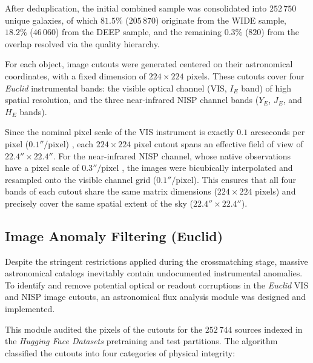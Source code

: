 After deduplication, the initial combined sample was consolidated into $252\,750$ unique galaxies, of which $81.5\%$ ($205\,870$) originate from the WIDE sample, $18.2\%$ ($46\,060$) from the DEEP sample, and the remaining $0.3\%$ ($820$) from the overlap resolved via the quality hierarchy.

For each object, image cutouts were generated centered on their astronomical coordinates, with a fixed dimension of $224 \times 224$ pixels. These cutouts cover four \textit{Euclid} instrumental bands: the visible optical channel (VIS, $I_E$ band) of high spatial resolution, and the three near-infrared NISP channel bands ($Y_E$, $J_E$, and $H_E$ bands).

Since the nominal pixel scale of the VIS instrument is exactly $0.1$ arcseconds per pixel ($0.1''/\text{pixel}$) \autocite{ar:cropper-2024}, each $224 \times 224$ pixel cutout spans an effective field of view of $22.4'' \times 22.4''$. For the near-infrared NISP channel, whose native observations have a pixel scale of $0.3''/\text{pixel}$ \autocite{ar:jahnke-2025}, the images were bicubically interpolated and resampled onto the visible channel grid ($0.1''/\text{pixel}$). This ensures that all four bands of each cutout share the same matrix dimensions ($224 \times 224$ pixels) and precisely cover the same spatial extent of the sky ($22.4'' \times 22.4''$).

\subsection{Image Anomaly Filtering (Euclid)}

Despite the stringent restrictions applied during the crossmatching stage, massive astronomical catalogs inevitably contain undocumented instrumental anomalies. To identify and remove potential optical or readout corruptions in the \textit{Euclid} VIS and NISP image cutouts, an astronomical flux analysis module was designed and implemented.

This module audited the pixels of the cutouts for the $252\,744$ sources indexed in the \textit{Hugging Face Datasets} pretraining and test partitions. The algorithm classified the cutouts into four categories of physical integrity:

